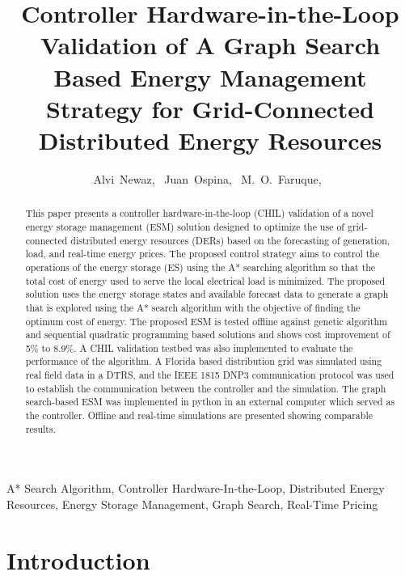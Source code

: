 \documentclass[journal]{IEEEtran}
\begin{document}
\title{Controller Hardware-in-the-Loop Validation of A Graph Search Based Energy Management Strategy for Grid-Connected Distributed Energy Resources}

\author{ Alvi~Newaz,~
Juan~Ospina,~
     M.~O.~Faruque,~
        }%
        
\maketitle
\begin{abstract}
This paper presents a controller hardware-in-the-loop (CHIL) validation of a novel energy storage management (ESM) solution designed to optimize the use of grid-connected distributed energy resources (DERs) based on the forecasting of generation, load, and real-time energy prices. The proposed control strategy aims to control the operations of the energy storage (ES) using the A* searching algorithm so that the total cost of energy used to serve the local electrical load is minimized. The proposed solution uses the energy storage states and available forecast data to generate a graph that is explored using the A* search algorithm with the objective of finding the optimum cost of energy. The proposed ESM is tested offline against genetic algorithm and sequential quadratic programming based solutions and shows cost improvement of 5\% to 8.9\%. A CHIL validation testbed was also implemented to evaluate the performance of the algorithm. A Florida based distribution grid was simulated using real field data in a DTRS, and the IEEE 1815 DNP3 communication protocol was used to establish the communication between the controller and the simulation. The graph search-based ESM was implemented in python in an external computer which served as the controller. Offline and real-time simulations are presented showing comparable results.  
\end{abstract}
                                         
\begin{IEEEkeywords}
A* Search Algorithm, Controller Hardware-In-the-Loop, Distributed Energy Resources, Energy Storage Management, Graph Search, Real-Time Pricing
\end{IEEEkeywords}

\IEEEpeerreviewmaketitle

\section{Introduction}

\end{document}
